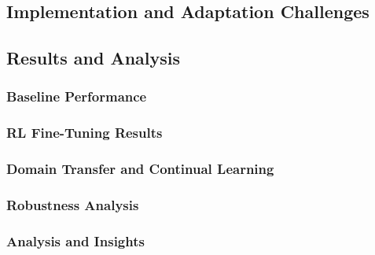 \documentclass[conference]{IEEEtran}
\begin{document}
\subsection{Implementation and Adaptation Challenges}

\subsection{Results and Analysis}

\subsubsection{Baseline Performance}

\subsubsection{RL Fine-Tuning Results}

\subsubsection{Domain Transfer and Continual Learning}

\subsubsection{Robustness Analysis}

\subsubsection{Analysis and Insights}
\end{document}
